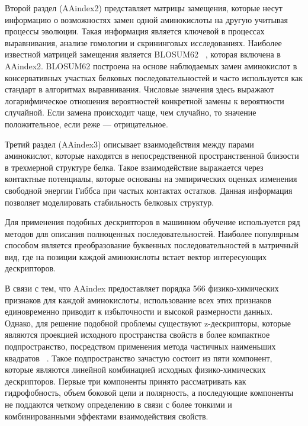 \documentclass[specification,annotation,times]{itmo-student-thesis}
\begin{document}
Второй раздел (AAindex2) представляет матрицы замещения, которые несут информацию о возможностях замен одной аминокислоты на другую учитывая процессы эволюции. Такая информация является ключевой в процессах выравнивания, анализе гомологии и скрининговых исследованиях. Наиболее известной матрицей замещения является BLOSUM62 ~\cite{eddy2004did}, которая включена в AAindex2. BLOSUM62 построена на основе наблюдаемых замен аминокислот в консервативных участках белковых последовательностей и часто используется как стандарт в алгоритмах выравнивания. Числовые значения здесь выражают логарифмическое отношения вероятностей конкретной замены к вероятности случайной. Если замена происходит чаще, чем случайно, то значение положительное, если реже --- отрицательное.

Третий раздел (AAindex3) описывает взаимодействия между парами аминокислот, которые находятся в непосредственной пространственной близости в трехмерной структуре белка. Такое взаимодействие выражается через контактные потенциалы, которые основаны на эмпирических оценках изменения свободной энергии Гиббса при частых контактах остатков. Данная информация позволяет моделировать стабильность белковых структур.

Для применения подобных дескрипторов в машинном обучение используется ряд методов для описания полноценных последовательностей. Наиболее популярным способом является преобразование буквенных последовательностей в матричный вид, где на позиции каждой аминокислоты встает вектор интересующих дескрипторов. 

В связи с тем, что AAindex предоставляет порядка 566 физико-химических признаков для каждой аминокислоты, использование всех этих признаков единовременно приводит к избыточности и высокой размерности данных. Однако, для решение подобной проблемы существуют \mbox{z-дескрипторы}, которые являются проекцией исходного пространства свойств в более компактное подпространство, посредством применения метода частичных наименьших квадратов ~\cite{sandberg1998new}. Такое подпространство зачастую состоит из пяти компонент, которые являются линейной комбинацией исходных физико-химических дескрипторов. Первые три компоненты принято рассматривать как гидрофобность, объем боковой цепи и полярность, а последующие компоненты не поддаются четкому определению в связи с более тонкими и комбинированными эффектами взаимодействия свойств. 
\end{document}
